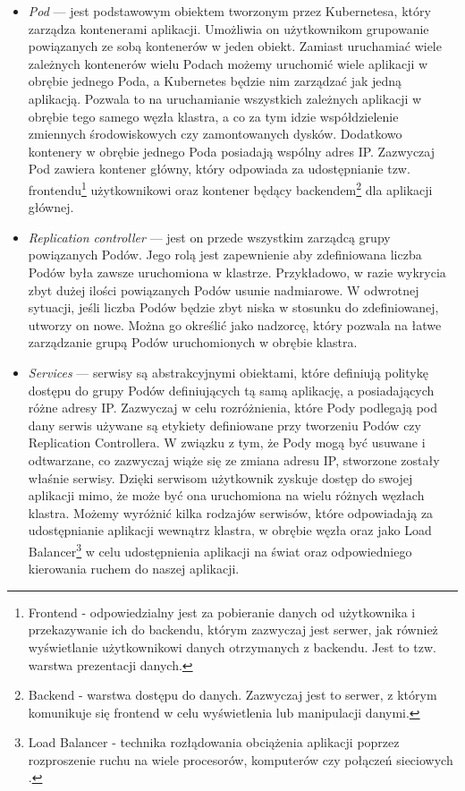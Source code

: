 \documentclass[12pt]{report}
\begin{document}
{\begin{itemize}
\item{{\it Pod} --- jest podstawowym obiektem tworzonym przez Kubernetesa, który zarządza kontenerami aplikacji. Umożliwia on użytkownikom grupowanie powiązanych ze sobą kontenerów w jeden obiekt. Zamiast uruchamiać wiele zależnych kontenerów wielu Podach możemy uruchomić wiele aplikacji w obrębie jednego Poda, a Kubernetes będzie nim zarządzać jak jedną aplikacją. Pozwala to na uruchamianie wszystkich zależnych aplikacji w obrębie tego samego węzła klastra, a co za tym idzie współdzielenie zmiennych środowiskowych czy zamontowanych dysków. Dodatkowo kontenery w obrębie jednego Poda posiadają wspólny adres IP. Zazwyczaj Pod zawiera kontener główny, który odpowiada za udostępnianie tzw. frontendu\footnote{Frontend - odpowiedzialny jest za pobieranie danych od użytkownika i przekazywanie ich do backendu, którym zazwyczaj jest serwer, jak również wyświetlanie użytkownikowi danych otrzymanych z backendu. Jest to tzw. warstwa prezentacji danych.} użytkownikowi oraz kontener będący backendem\footnote{Backend - warstwa dostępu do danych. Zazwyczaj jest to serwer, z którym komunikuje się frontend w celu wyświetlenia lub manipulacji danymi.} dla aplikacji głównej.}

\item{{\it Replication controller} --- jest on przede wszystkim zarządcą grupy powiąza\-nych Podów. Jego rolą jest zapewnienie aby zdefiniowana liczba Podów była zawsze uruchomiona w klastrze. Przykładowo, w razie wykrycia zbyt dużej ilości powiązanych Podów usunie nadmiarowe. W odwrotnej sytuacji, jeśli liczba Podów będzie zbyt niska w stosunku do zdefiniowanej, utworzy on nowe. Można go określić jako nadzorcę, który pozwala na łatwe zarządzanie grupą Podów uruchomionych w obrębie klastra.}

\item{{\it Services} --- serwisy są abstrakcyjnymi obiektami, które definiują politykę dostępu do grupy Podów definiujących tą samą aplikację, a posiadających różne adresy IP. Zazwyczaj w celu rozróżnienia, które Pody podlegają pod dany serwis używane są etykiety definiowane przy tworzeniu Podów czy Replication Controllera. W związku z tym, że Pody mogą być usuwane i odtwarzane, co zazwyczaj wiąże się ze zmiana adresu IP, stworzone zostały właśnie serwisy. Dzięki serwisom użytkownik zyskuje dostęp do swojej aplikacji mimo, że może być ona uruchomiona na wielu różnych węzłach klastra. Możemy wyróżnić kilka rodzajów serwisów, które odpowiadają za udostępnianie aplikacji wewnątrz klastra, w obrębie węzła oraz jako Load Balancer\footnote{Load Balancer - technika rozłądowania obciążenia aplikacji poprzez rozproszenie ruchu na wiele procesorów, komputerów czy połączeń sieciowych \cite{cloud}.} w celu udostępnienia aplikacji na świat oraz odpowiedniego kierowania ruchem do naszej aplikacji.}
\end{itemize}

}
\end{document}
